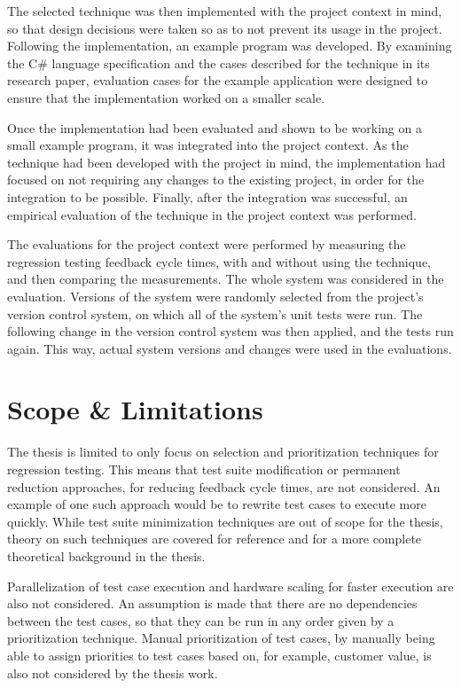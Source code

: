 \documentclass[a4paper,english,12pt]{report}
\begin{document}
The selected technique was then implemented with the project context in mind, so that design decisions were taken so as to not prevent its usage in the project. Following the implementation, an example program was developed. By examining the C\# language specification and the cases described for the technique in its research paper, evaluation cases for the example application were designed to ensure that the implementation worked on a smaller scale.

Once the implementation had been evaluated and shown to be working on a small example program, it was integrated into the project context. As the technique had been developed with the project in mind, the implementation had focused on not requiring any changes to the existing project, in order for the integration to be possible. Finally, after the integration was successful, an empirical evaluation of the technique in the project context was performed. 

The evaluations for the project context were performed by measuring the regression testing feedback cycle times, with and without using the technique, and then comparing the measurements. The whole system was considered in the evaluation. Versions of the system were randomly selected from the project's version control system, on which all of the system's unit tests were run. The following change in the version control system was then applied, and the tests run again. This way, actual system versions and changes were used in the evaluations.

\section{Scope \& Limitations}
The thesis is limited to only focus on selection and prioritization techniques for regression testing. This means that test suite modification or permanent reduction approaches, for reducing feedback cycle times, are not considered. An example of one such approach would be to rewrite test cases to execute more quickly. While test suite minimization techniques are out of scope for the thesis, theory on such techniques are covered for reference and for a more complete theoretical background in the thesis.

Parallelization of test case execution and hardware scaling for faster execution are also not considered. An assumption is made that there are no dependencies between the test cases, so that they can be run in any order given by a prioritization technique. Manual prioritization of test cases, by manually being able to assign priorities to test cases based on, for example, customer value, is also not considered by the thesis work.
\end{document}
